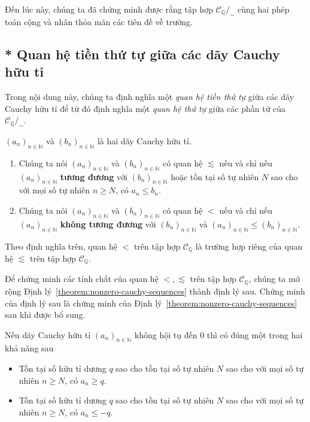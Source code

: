 Đến lúc này, chúng ta đã chứng minh được rằng tập hợp $\mathscr{C}_{\mathbb{Q}}/_{\sim}$ cùng hai phép toán cộng và nhân thỏa mãn các tiên đề về trường.

\subsection{* Quan hệ tiền thứ tự giữa các dãy Cauchy hữu tỉ}

Trong nội dung này, chúng ta định nghĩa một \textit{quan hệ tiền thứ tự} giữa các dãy Cauchy hữu tỉ để từ đó định nghĩa một \textit{quan hệ thứ tự} giữa các phần tử của $\mathscr{C}_{\mathbb{Q}}/_{\sim}$.

\begin{definition}
    ${(a_{n})}_{n\in\mathbb{N}}$ và ${(b_{n})}_{n\in\mathbb{N}}$ là hai dãy Cauchy hữu tỉ.
    \begin{enumerate}[label={(\roman*)}]
        \item Chúng ta nói ${(a_{n})}_{n\in\mathbb{N}}$ và ${(b_{n})}_{n\in\mathbb{N}}$ có quan hệ $\lesssim$ nếu và chỉ nếu ${(a_{n})}_{n\in\mathbb{N}}$ \textbf{tương đương} với ${(b_{n})}_{n\in\mathbb{N}}$ hoặc tồn tại số tự nhiên $N$ sao cho với mọi số tự nhiên $n\geq N$, có $a_{n}\leq b_{n}$.
        \item Chúng ta nói ${(a_{n})}_{n\in\mathbb{N}}$ và ${(b_{n})}_{n\in\mathbb{N}}$ có quan hệ $<$ nếu và chỉ nếu ${(a_{n})}_{n\in\mathbb{N}}$ \textbf{không tương đương} với ${(b_{n})}_{n\in\mathbb{N}}$ và ${(a_{n})}_{n\in\mathbb{N}}\leq {(b_{n})}_{n\in\mathbb{N}}$.
    \end{enumerate}
\end{definition}

Theo định nghĩa trên, quan hệ $<$ trên tập hợp $\mathscr{C}_{\mathbb{Q}}$ là trường hợp riêng của quan hệ $\lesssim$ trên tập hợp $\mathscr{C}_{\mathbb{Q}}$.

Để chứng minh các tính chất của quan hệ $<, \lesssim$ trên tập hợp $\mathscr{C}_{\mathbb{Q}}$, chúng ta mở rộng Định lý~\ref{theorem:nonzero-cauchy-sequences} thành định lý sau. Chứng minh của định lý sau là chứng minh của Định lý~\ref{theorem:nonzero-cauchy-sequences} sau khi được bổ sung.
\begin{theorem}\label{theorem:nonzero-cauchy-sequences-and-preorder}
    Nếu dãy Cauchy hữu tỉ ${(a_{n})}_{n\in\mathbb{N}}$ không hội tụ đến $0$ thì có đúng một trong hai khả năng sau
    \begin{itemize}
        \item Tồn tại số hữu tỉ dương $q$ sao cho tồn tại số tự nhiên $N$ sao cho với mọi số tự nhiên $n\geq N$, có $a_{n}\geq q$.
        \item Tồn tại số hữu tỉ dương $q$ sao cho tồn tại số tự nhiên $N$ sao cho với mọi số tự nhiên $n\geq N$, có $a_{n}\leq -q$.
    \end{itemize}
\end{theorem}

